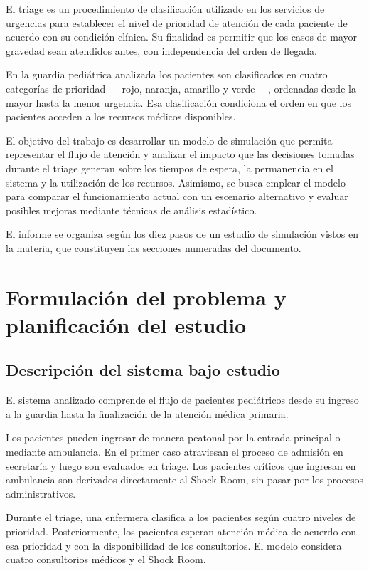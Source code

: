 \documentclass{article}
\begin{document}
El triage es un procedimiento de clasificación utilizado en los servicios de
urgencias para establecer el nivel de prioridad de atención de cada paciente
de acuerdo con su condición clínica. Su finalidad es permitir que los casos
de mayor gravedad sean atendidos antes, con independencia del orden de
llegada.

En la guardia pediátrica analizada los pacientes son clasificados en cuatro
categorías de prioridad --- rojo, naranja, amarillo y verde ---, ordenadas
desde la mayor hasta la menor urgencia. Esa clasificación condiciona el orden
en que los pacientes acceden a los recursos médicos disponibles.

El objetivo del trabajo es desarrollar un modelo de simulación que permita
representar el flujo de atención y analizar el impacto que las decisiones
tomadas durante el triage generan sobre los tiempos de espera, la permanencia
en el sistema y la utilización de los recursos. Asimismo, se busca emplear el
modelo para comparar el funcionamiento actual con un escenario alternativo y
evaluar posibles mejoras mediante técnicas de análisis estadístico.

El informe se organiza según los diez pasos de un estudio de simulación
vistos en la materia, que constituyen las secciones numeradas del documento.

\section{Formulación del problema y planificación del estudio}

\subsection{Descripción del sistema bajo estudio}

El sistema analizado comprende el flujo de pacientes pediátricos desde su
ingreso a la guardia hasta la finalización de la atención médica primaria.

Los pacientes pueden ingresar de manera peatonal por la entrada principal o
mediante ambulancia. En el primer caso atraviesan el proceso de admisión en
secretaría y luego son evaluados en triage. Los pacientes críticos que
ingresan en ambulancia son derivados directamente al Shock Room, sin pasar
por los procesos administrativos.

Durante el triage, una enfermera clasifica a los pacientes según cuatro
niveles de prioridad. Posteriormente, los pacientes esperan atención médica
de acuerdo con esa prioridad y con la disponibilidad de los consultorios. El
modelo considera cuatro consultorios médicos y el Shock Room.
\end{document}

